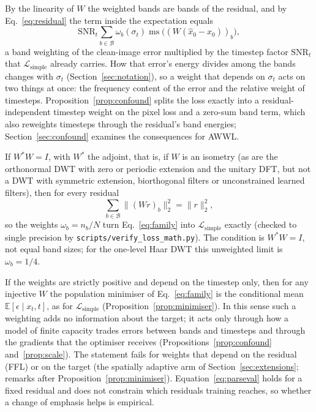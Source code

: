 By the linearity of $W$ the weighted bands are bands of the residual, and by
Eq.~\eqref{eq:residual} the term inside the expectation equals
\begin{equation}
  \mathrm{SNR}_t \sum_{b \in \mathcal{B}} \omega_b(\sigma_t)
  \operatorname{ms}\big((W(\hat x_0 - x_0))_b\big),
  \label{eq:family-x0}
\end{equation}
a band weighting of the clean-image error multiplied by the timestep factor
$\mathrm{SNR}_t$ that $\mathcal{L}_{\mathrm{simple}}$ already carries. How
that error's energy divides among the bands changes with $\sigma_t$
(Section~\ref{sec:notation}), so a weight that depends on $\sigma_t$ acts on
two things at once: the frequency content of the error and the relative
weight of timesteps. Proposition~\ref{prop:confound} splits the loss exactly
into a residual-independent timestep weight on the pixel loss and a zero-sum
band term, which also reweights timesteps through the residual's band
energies; Section~\ref{sec:confound} examines the consequences for AWWL.

\label{sec:family-parseval}
\label{sec:family-info}
If $W^{*}W = I$, with $W^{*}$ the adjoint, that is, if $W$ is an isometry (as
are the orthonormal DWT with zero or periodic extension and the unitary DFT,
but not a DWT with symmetric extension, biorthogonal filters or unconstrained
learned filters), then for every residual
\begin{equation}
  \sum_{b \in \mathcal{B}} \big\lVert (W r)_b \big\rVert_2^2 = \lVert r \rVert_2^2 ,
  \label{eq:parseval}
\end{equation}
so the weights $\omega_b = n_b/N$ turn Eq.~\eqref{eq:family} into
$\mathcal{L}_{\mathrm{simple}}$ exactly (checked to single precision by
\texttt{scripts/verify\_loss\_math.py}). The condition is $W^{*}W = I$, not
equal band sizes; for the one-level Haar DWT this unweighted limit is
$\omega_b = 1/4$.

If the weights are strictly positive and depend on the timestep only, then
for any injective $W$ the population minimiser of Eq.~\eqref{eq:family} is
the conditional mean $\mathbb{E}[\epsilon \mid x_t, t]$, as for
$\mathcal{L}_{\mathrm{simple}}$ (Proposition~\ref{prop:minimiser}). In
this sense such a weighting adds no information about the target; it acts
only through how a model of finite capacity trades errors between bands and
timesteps and through the gradients that the optimiser receives
(Propositions~\ref{prop:confound} and~\ref{prop:scale}). The statement fails
for weights that depend on the residual (FFL) or on the target (the spatially
adaptive arm of Section~\ref{sec:extensions}; remarks after
Proposition~\ref{prop:minimiser}).
Equation~\eqref{eq:parseval} holds for a fixed residual and does not constrain
which residuals training reaches, so whether a change of emphasis helps is
empirical.

